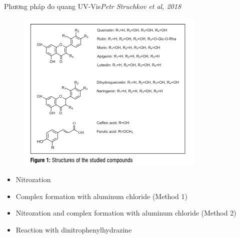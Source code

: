\documentclass[11pt]{beamer}
\begin{document}
\begin{frame}{Phương pháp đo quang UV-Vis\tiny{\it Petr Struchkov et al, 2018}}
	\begin{figure}
		\centering
		\includegraphics[scale=0.4]{Flavonoid UV.png}
	\end{figure}
	{\footnotesize
	\begin{itemize}
		\item Nitrozation
		\item Complex formation with aluminum chloride (Method 1)
		\item Nitrozation and complex formation with aluminum chloride (Method 2)
		\item Reaction with dinitrophenylhydrazine
	\end{itemize}
	}
\end{frame}
\end{document}
